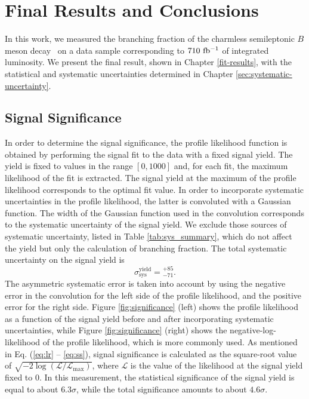 \chapter{Final Results and Conclusions}\label{sec:results}

In this work, we measured the branching fraction of the charmless semileptonic $B$ meson decay \decayb~on a data sample corresponding to $710\mathrm{~fb^{-1}}$ of integrated luminosity. We present the final result, shown in Chapter \ref{fit-results}, with the statistical and systematic uncertainties determined in Chapter \ref{sec:systematic-uncertainty}.

\section{Signal Significance}

In order to determine the signal significance, the profile likelihood function is obtained by performing the signal fit to the data with a fixed signal yield. The yield is fixed to values in the range $[0, 1000]$ and, for each fit, the maximum likelihood of the fit is extracted. The signal yield at the maximum of the profile likelihood corresponds to the optimal fit value. In order to incorporate systematic uncertainties in the profile likelihood, the latter is convoluted with a Gaussian function. The width of the Gaussian function used in the convolution corresponds to the systematic uncertainty of the signal yield. We exclude those sources of systematic uncertainty, listed in Table \ref{tab:sys_summary}, which do not affect the yield but only the calculation of branching fraction. The total systematic uncertainty on the signal yield is
\begin{equation}
\sigma_{\mathrm{sys}}^{\mathrm{yield}} = {}_{-71}^{+85}.
\end{equation}
The asymmetric systematic error is taken into account by using the negative error in the convolution for the left side of the profile likelihood, and the positive error for the right side. Figure \ref{fig:significance} (left) shows the profile likelihood as a function of the signal yield before and after incorporating systematic uncertainties, while Figure \ref{fig:significance} (right) shows the negative-log-likelihood of the profile likelihood, which is more commonly used. As mentioned in Eq. (\ref{eq:lr} -- \ref{eq:ss}), signal significance is calculated as the square-root value of $\sqrt{-2\log(\mathcal{L}/\mathcal{L}_{\mathrm{max}})}$, where $\mathcal{L}$ is the value of the likelihood at the signal yield fixed to 0. In this measurement, the statistical significance of the signal yield is equal to about $6.3\sigma$, while the total significance amounts to about $4.6\sigma$.

